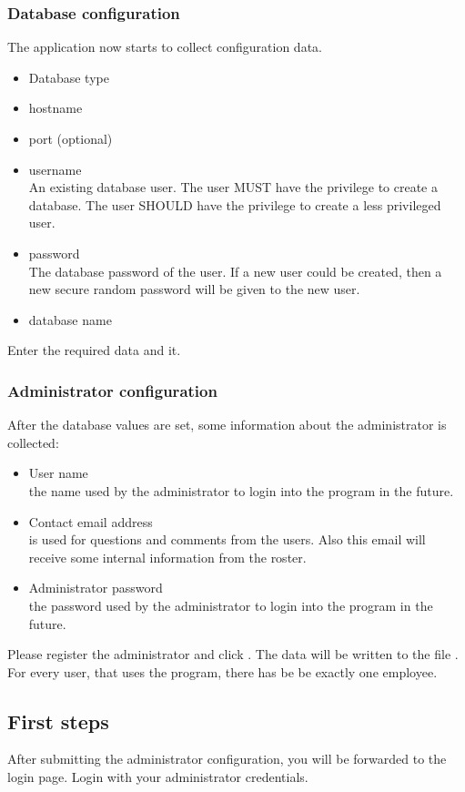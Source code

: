 \subsubsection{Database configuration}
The application now starts to collect configuration data.
\begin{itemize}
\item Database type
\item hostname
\item port (optional)
\item username \\An existing database user. The user MUST have the privilege to create a database. The user SHOULD have the privilege to create a less privileged user.
\item password \\The database password of the user. If a new user could be created, then a new secure random password will be given to the new user.
\item database name
\end{itemize}
Enter the required data and  it.

\subsubsection{Administrator configuration}
After the database values are set, some information about the administrator is collected:
\begin{itemize}
    \item User name\\ the name used by the administrator to login into the program in the future. 
    \item Contact email address\\ is used for questions and comments from the users. Also this email will receive some internal information from the roster.
    \item Administrator password\\ the password used by the administrator to login into the program in the future. 
\end{itemize}
Please register the administrator and click .
The data will be written to the file .
For every user, that uses the program, there has be be exactly one employee. 
\subsection{First steps}
After submitting the administrator configuration, you will be forwarded to the login page.
Login with your administrator credentials.

